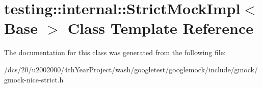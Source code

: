 \hypertarget{classtesting_1_1internal_1_1StrictMockImpl}{}\section{testing\+:\+:internal\+:\+:Strict\+Mock\+Impl$<$ Base $>$ Class Template Reference}
\label{classtesting_1_1internal_1_1StrictMockImpl}


The documentation for this class was generated from the following file\+:\begin{DoxyCompactItemize}
\item 
/dcs/20/u2002000/4th\+Year\+Project/wash/googletest/googlemock/include/gmock/gmock-\/nice-\/strict.\+h\end{DoxyCompactItemize}
